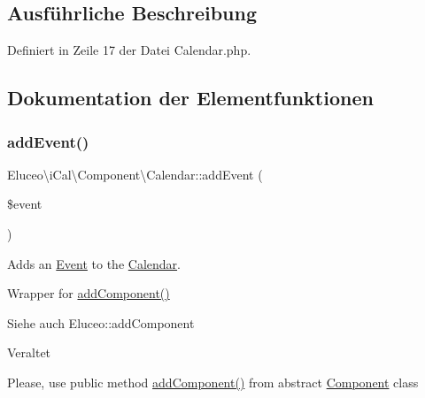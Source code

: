 \subsection{Ausführliche Beschreibung}


Definiert in Zeile 17 der Datei Calendar.\+php.



\subsection{Dokumentation der Elementfunktionen}
\mbox{\label{class_eluceo_1_1i_cal_1_1_component_1_1_calendar_a1f0cf8d3ca1bfee4d03b352d2f6d1698}} 
\subsubsection{\texorpdfstring{add\+Event()}{addEvent()}\hspace{0.1cm}{\footnotesize\ttfamily [1/3]}}
{\footnotesize\ttfamily Eluceo\textbackslash{}i\+Cal\textbackslash{}\+Component\textbackslash{}\+Calendar\+::add\+Event (\begin{DoxyParamCaption}\item[{\mbox{\hyperlink{class_eluceo_1_1i_cal_1_1_component_1_1_event}{Event}}}]{\$event }\end{DoxyParamCaption})}

Adds an \mbox{\hyperlink{class_eluceo_1_1i_cal_1_1_component_1_1_event}{Event}} to the \mbox{\hyperlink{class_eluceo_1_1i_cal_1_1_component_1_1_calendar}{Calendar}}.

Wrapper for \mbox{\hyperlink{class_eluceo_1_1i_cal_1_1_component_a5adac138a8cda08ed3c60b298cc9e145}{add\+Component()}}

\begin{DoxySeeAlso}{Siehe auch}
Eluceo\+::add\+Component 
\end{DoxySeeAlso}
\begin{DoxyRefDesc}{Veraltet}
\item[\mbox{\hyperlink{deprecated__deprecated000004}{Veraltet}}]Please, use public method \mbox{\hyperlink{class_eluceo_1_1i_cal_1_1_component_a5adac138a8cda08ed3c60b298cc9e145}{add\+Component()}} from abstract \mbox{\hyperlink{class_eluceo_1_1i_cal_1_1_component}{Component}} class\end{DoxyRefDesc}



